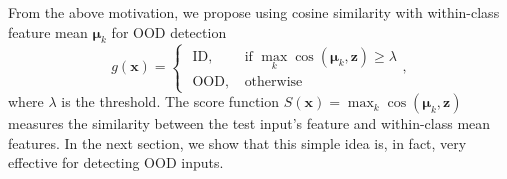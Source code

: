 \documentclass[nohyperref]{article}
\theoremstyle{plain}
\theoremstyle{definition}
\theoremstyle{remark}
\begin{document}
From the above motivation, we propose using cosine similarity with within-class feature mean $\boldsymbol{\mu}_k$ for OOD detection
\begin{equation*}
g(\mathbf{x})= \begin{cases}\text { ID}, & \text { if } \underset{k}{\max} \cos(\boldsymbol{\mu}_k, \mathbf{z}) \ge \lambda \\ \text { OOD}, & \text { otherwise} \end{cases},
\end{equation*}
where $\lambda$ is the threshold.
The score function $S(\mathbf{x}) = \max_k \cos(\boldsymbol{\mu}_k, \mathbf{z})$ measures the similarity between the test input's feature and within-class mean features. 
In the next section, we show that this simple idea is, in fact, very effective for detecting OOD inputs.
\end{document}
